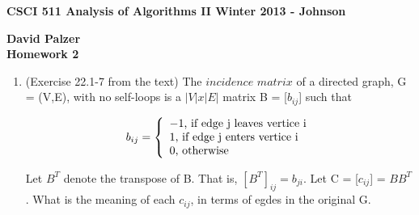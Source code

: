 \documentclass[11pt]{article}
\begin{document}
\textbf{CSCI 511 Analysis of Algorithms II \hfill Winter 2013 - Johnson}

\begin{center}
\textbf{David Palzer \\ Homework 2}
\end{center}

\begin{enumerate}

\item (Exercise 22.1-7 from the text) The $incidence$ $matrix$ of a directed graph, G = (V,E), with no self-loops is a $|V|x|E|$ matrix B = [$b_{ij}$] such that

	\begin{displaymath}
		b_{ij} = \left\{
			\begin{array}{lr}
				-1 $, if edge j leaves vertice i$\\
				1  $, if edge j enters vertice i$\\
				0  $, otherwise$
			\end{array}
		\right.
	\end{displaymath}
			
	Let $B^T$ denote the transpose of B. That is, $[B^T]_{ij} = b_{ji}$. Let C = [$c_{ij}$] = $BB^T$. What is the meaning of each $c_{ij}$, in terms of egdes in the original G.\\
	

\end{enumerate}
\end{document}
